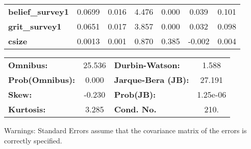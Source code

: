 \documentclass{report}
\begin{document}
\begin{center}
\begin{tabular}{lcccccc}
\textbf{belief\_survey1} &       0.0699  &        0.016     &     4.476  &         0.000        &        0.039    &        0.101     \\
\textbf{grit\_survey1}   &       0.0651  &        0.017     &     3.857  &         0.000        &        0.032    &        0.098     \\
\textbf{csize}           &       0.0013  &        0.001     &     0.870  &         0.385        &       -0.002    &        0.004     \\
\bottomrule
\end{tabular}
\begin{tabular}{lclc}
\textbf{Omnibus:}       & 25.536 & \textbf{  Durbin-Watson:     } &    1.588  \\
\textbf{Prob(Omnibus):} &  0.000 & \textbf{  Jarque-Bera (JB):  } &   27.191  \\
\textbf{Skew:}          & -0.230 & \textbf{  Prob(JB):          } & 1.25e-06  \\
\textbf{Kurtosis:}      &  3.285 & \textbf{  Cond. No.          } &     210.  \\
\bottomrule
\end{tabular}
\end{center}

Warnings: \newline
 [1] Standard Errors assume that the covariance matrix of the errors is correctly specified.
\end{document}
